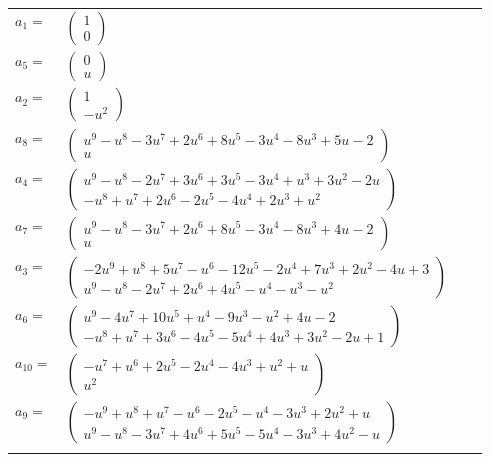 \documentclass[1p]{elsarticle_modified}
\theoremstyle{definition}
\begin{document}
\begin{tabular}{m{7pt} m{180pt} m{7pt} m{180pt} }
\flushright $a_{1}=$&$\begin{pmatrix}1\\0\end{pmatrix}$ \\
\flushright $a_{5}=$&$\begin{pmatrix}0\\u\end{pmatrix}$ \\
\flushright $a_{2}=$&$\begin{pmatrix}1\\- u^2\end{pmatrix}$ \\
\flushright $a_{8}=$&$\begin{pmatrix}u^9- u^8-3 u^7+2 u^6+8 u^5-3 u^4-8 u^3+5 u-2\\u\end{pmatrix}$ \\
\flushright $a_{4}=$&$\begin{pmatrix}u^9- u^8-2 u^7+3 u^6+3 u^5-3 u^4+u^3+3 u^2-2 u\\- u^8+u^7+2 u^6-2 u^5-4 u^4+2 u^3+u^2\end{pmatrix}$ \\
\flushright $a_{7}=$&$\begin{pmatrix}u^9- u^8-3 u^7+2 u^6+8 u^5-3 u^4-8 u^3+4 u-2\\u\end{pmatrix}$ \\
\flushright $a_{3}=$&$\begin{pmatrix}-2 u^9+u^8+5 u^7- u^6-12 u^5-2 u^4+7 u^3+2 u^2-4 u+3\\u^9- u^8-2 u^7+2 u^6+4 u^5- u^4- u^3- u^2\end{pmatrix}$ \\
\flushright $a_{6}=$&$\begin{pmatrix}u^9-4 u^7+10 u^5+u^4-9 u^3- u^2+4 u-2\\- u^8+u^7+3 u^6-4 u^5-5 u^4+4 u^3+3 u^2-2 u+1\end{pmatrix}$ \\
\flushright $a_{10}=$&$\begin{pmatrix}- u^7+u^6+2 u^5-2 u^4-4 u^3+u^2+u\\u^2\end{pmatrix}$ \\
\flushright $a_{9}=$&$\begin{pmatrix}- u^9+u^8+u^7- u^6-2 u^5- u^4-3 u^3+2 u^2+u\\u^9- u^8-3 u^7+4 u^6+5 u^5-5 u^4-3 u^3+4 u^2- u\end{pmatrix}$\\&\end{tabular}
\end{document}

